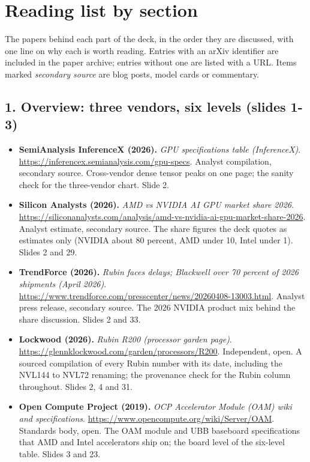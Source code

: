 \section*{Reading list by section}
The papers behind each part of the deck, in the order they are discussed, with one line on why each is worth reading. Entries with an arXiv identifier are included in the paper archive; entries without one are listed with a URL. Items marked \emph{secondary source} are blog posts, model cards or commentary.

\subsection*{1. Overview: three vendors, six levels (slides 1-3)}
\begin{itemize}[leftmargin=1.2em,itemsep=3pt]\sloppy
\item \textbf{SemiAnalysis InferenceX (2026).} \textit{GPU specifications table (InferenceX)}. \url{https://inferencex.semianalysis.com/gpu-specs}. Analyst compilation, secondary source. Cross-vendor dense tensor peaks on one page; the sanity check for the three-vendor chart. Slide 2.
\item \textbf{Silicon Analysts (2026).} \textit{AMD vs NVIDIA AI GPU market share 2026}. \url{https://siliconanalysts.com/analysis/amd-vs-nvidia-ai-gpu-market-share-2026}. Analyst estimate, secondary source. The share figures the deck quotes as estimates only (NVIDIA about 80 percent, AMD under 10, Intel under 1). Slides 2 and 29.
\item \textbf{TrendForce (2026).} \textit{Rubin faces delays; Blackwell over 70 percent of 2026 shipments (April 2026)}. \url{https://www.trendforce.com/presscenter/news/20260408-13003.html}. Analyst press release, secondary source. The 2026 NVIDIA product mix behind the share discussion. Slides 2 and 33.
\item \textbf{Lockwood (2026).} \textit{Rubin R200 (processor garden page)}. \url{https://glennklockwood.com/garden/processors/R200}. Independent, open. A sourced compilation of every Rubin number with its date, including the NVL144 to NVL72 renaming; the provenance check for the Rubin column throughout. Slides 2, 4 and 31.
\item \textbf{Open Compute Project (2019).} \textit{OCP Accelerator Module (OAM) wiki and specifications}. \url{https://www.opencompute.org/wiki/Server/OAM}. Standards body, open. The OAM module and UBB baseboard specifications that AMD and Intel accelerators ship on; the board level of the six-level table. Slides 3 and 23.
\end{itemize}
